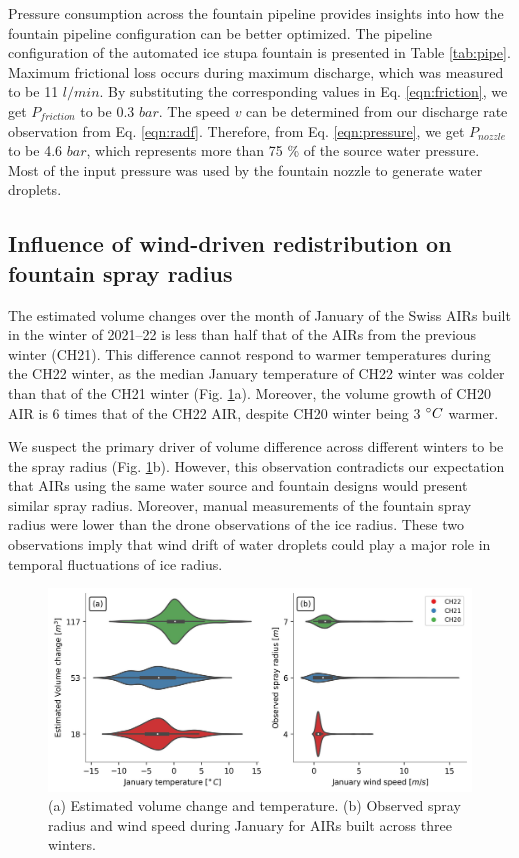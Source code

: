 \documentclass[tc, manuscript]{copernicus}
\begin{document}
Pressure consumption across the fountain pipeline provides insights into how the fountain pipeline
configuration can be better optimized. The pipeline configuration of the automated ice stupa fountain is presented
in Table \ref{tab:pipe}. Maximum frictional loss occurs during maximum discharge, which was measured to be 11
$l/min$. By substituting the corresponding values in Eq. \ref{eqn:friction}, we get $P_{friction}$ to be 0.3
$bar$. The speed $v$ can be determined from our discharge rate observation from Eq. \ref{eqn:radf}.
Therefore, from Eq. \ref{eqn:pressure}, we get $P_{nozzle}$ to be 4.6 $bar$, which represents more than 75 \% of the
source water pressure. Most of the input pressure was used by the fountain nozzle to generate water droplets.

\subsection{Influence of wind-driven redistribution on fountain spray radius}

The estimated volume changes over the month of January of the Swiss AIRs built in the winter of 2021--22 is less
than half that of the AIRs from the previous winter (CH21). This difference cannot respond to warmer
temperatures during the CH22 winter, as the median January temperature of CH22 winter was colder than that of the
CH21 winter (Fig. \ref{fig:CH_diffs}a). Moreover, the volume growth of CH20 AIR is 6 times that of the CH22 AIR,
despite CH20 winter being 3 $^{\circ} C$ warmer.

We suspect the primary driver of volume difference across different winters to be the spray radius (Fig. \ref{fig:CH_diffs}b). However, this observation contradicts our expectation that AIRs using the same
water source and fountain designs would present similar spray radius. Moreover, manual measurements of the fountain spray
radius were lower than the drone observations of the ice radius. These two observations imply
that wind drift of water droplets could play a major role in temporal fluctuations of ice radius.

\begin{figure}[htb]
\includegraphics[width=\textwidth]{Figures/CH_diffs.jpg}

\caption{(a) Estimated volume change and temperature. (b) Observed spray radius and wind speed
during January for AIRs built across three winters. } 

\label{fig:CH_diffs} 
\end{figure}
\end{document}
